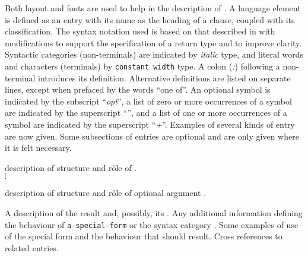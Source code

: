 %
\begin{optDefinition}
Both layout and fonts are used to help in the description of \eulisp.  A
language element is defined as an entry with its name as the heading of a
clause, coupled with its classification.  The syntax notation used is based on
that described in \cite{iso9899} with modifications to support the specification
of a return type and to improve clarity.  Syntactic categories (non-terminals)
are indicated by {\it italic} type, and literal words and characters (terminals)
by {\tt constant width} type.  A colon ({\it :}) following a non-terminal
introduces its definition.  Alternative definitions are listed on separate
lines, except when prefaced by the words ``one of''.  An optional symbol is
indicated by the subscript ``{\it opt}'', a list of zero or more occurrences of
a symbol are indicated by the superscript ``{\it *}'', and a list of one or more
occurrences of a symbol are indicated by the superscript ``{\it +}''.  Examples
of several kinds of entry are now given.  Some subsections of entries are
optional and are only given where it is felt necessary.
%
%
\Syntax
{}
%
\begin{arguments}
    \item[\sc{form-1}] description of structure and r\^ole of .\\
    $\vdots$
    \item[\scopt{form-n}] description of structure and r\^ole of optional
    argument .
\end{arguments}
%
\result%
A description of the result and, possibly, its .
%
\remarks%
Any additional information defining the behaviour of {\tt a-special-form} or the
syntax category .
%
\examples
Some examples of use of the special form and the behaviour that should
result.
%
\seealso%
Cross references to related entries.
%
%
\Signature
{}

\end{optDefinition}
